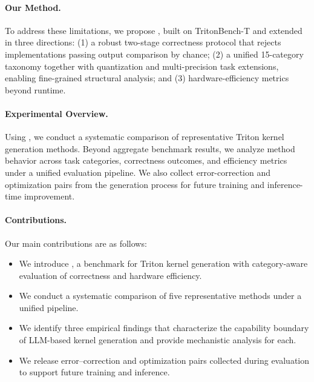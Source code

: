 \paragraph{Our Method.}
To address these limitations, we propose \textbf{\oursys}, built on TritonBench-T and extended in three directions: (1) a robust two-stage correctness protocol that rejects implementations passing output comparison by chance; (2) a unified 15-category taxonomy together with quantization and multi-precision task extensions, enabling fine-grained structural analysis; and (3) hardware-efficiency metrics beyond runtime.

\paragraph{Experimental Overview.}

Using \oursys, we conduct a systematic comparison of representative Triton kernel generation methods. Beyond aggregate benchmark results, we analyze method behavior across task categories, correctness outcomes, and efficiency metrics under a unified evaluation pipeline. We also collect error-correction and optimization pairs from the generation process for future training and inference-time improvement.

\paragraph{Contributions.}
Our main contributions are as follows:
\begin{itemize}
    \item We introduce \textbf{\oursys}, a benchmark for Triton kernel generation with category-aware evaluation of correctness and hardware efficiency.
    \item We conduct a systematic comparison of five representative methods under a unified pipeline.
    \item We identify three empirical findings that characterize the capability boundary of LLM-based kernel generation and provide mechanistic analysis for each.
    \item We release error--correction and optimization pairs collected during evaluation to support future training and inference.
\end{itemize}